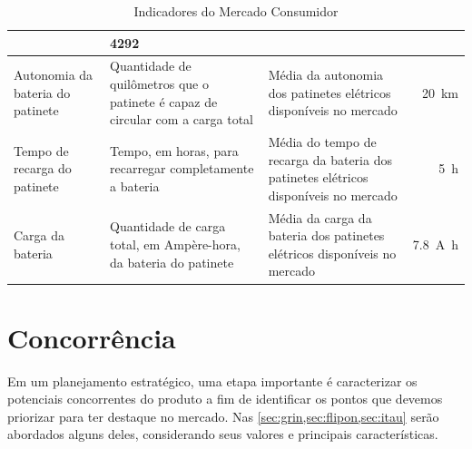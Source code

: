 \begin{table}
\begin{tabular}{p{}p{}p{}r}
                                                                                                                      &
        \num{4292}                                                                                                      \\
        \midrule
        Autonomia da bateria do patinete                                                                              &
        Quantidade de quilômetros que o patinete é capaz de circular com a carga total                                &
        Média da autonomia dos patinetes elétricos disponíveis no mercado                                             &
        \SI{20}{\km}                                                                                                    \\
        \midrule
        Tempo de recarga do patinete                                                                                  &
        Tempo, em horas, para recarregar completamente a bateria                                                      &
        Média do tempo de recarga da bateria dos patinetes elétricos disponíveis no mercado                           &
        \SI{5}{\hour}                                                                                                   \\
        \midrule
        Carga da bateria                                                                                              &
        Quantidade de carga total, em Ampère-hora, da bateria do patinete                                             &
        Média da carga da bateria dos patinetes elétricos disponíveis no mercado                                      &
        \SI{7,8}{\ampere\hour}                                                                                          \\
        \bottomrule
    \end{tabular}
    \caption{Indicadores do Mercado Consumidor}
    \label{tab:indicadores}
    \let\theadfont\temp %
\end{table}


\section{Concorrência}

Em um planejamento estratégico, uma etapa importante é caracterizar os potenciais concorrentes do produto a fim de identificar os pontos que  devemos priorizar para ter destaque no mercado. Nas \cref{sec:grin,sec:flipon,sec:itau} serão abordados alguns deles, considerando seus valores e principais características.

